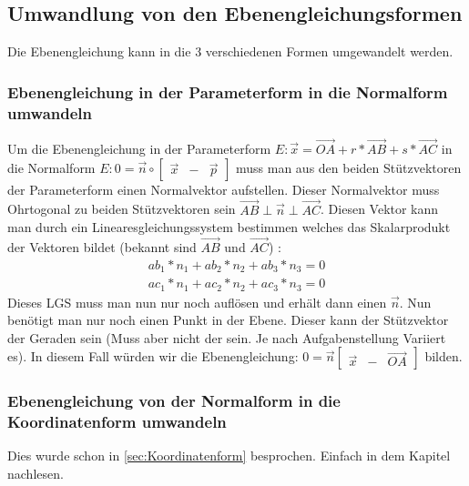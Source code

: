 \documentclass{article}
\begin{document}
\subsection{Umwandlung von den Ebenengleichungsformen} \label{UmformenDerEbenengleichung}
Die Ebenengleichung kann in die 3 verschiedenen Formen umgewandelt werden.
\subsubsection{Ebenengleichung in der Parameterform in die Normalform umwandeln} \label{ParameterformInNormalform}
Um die Ebenengleichung in der Parameterform $E : \vec{x} = \vec{OA} + r * \vec{AB} + s * \vec{AC}$ in die Normalform $E: 0 = \vec{n} \circ  \begin{bmatrix} \vec{x} & - & \vec{p} \end{bmatrix}$ muss man aus den beiden Stützvektoren der Parameterform einen Normalvektor aufstellen. Dieser Normalvektor muss Ohrtogonal zu beiden Stützvektoren sein $\vec{AB} \perp \vec{n} \perp \vec{AC}$. Diesen Vektor kann man durch ein Linearesgleichungssystem bestimmen welches das Skalarprodukt der Vektoren bildet (bekannt sind $\vec{AB}$ und $\vec{AC}$) : 
\begin{equation}
\begin{matrix}
ab_1 * n_1 + ab_2 * n_2 + ab_3 * n_3 = 0 \\
ac_1 * n_1 + ac_2 * n_2 + ac_3 * n_3 = 0
\end{matrix}
\end{equation}  
Dieses LGS muss man nun nur noch auflösen und erhält dann einen $\vec{n}$. Nun benötigt man nur noch einen Punkt in der Ebene. Dieser kann der Stützvektor der Geraden sein (Muss aber nicht der sein. Je nach Aufgabenstellung Variiert es). In diesem Fall würden wir die Ebenengleichung: $0 = \vec{n} \begin{bmatrix}\vec{x} & - & \vec{OA}\end{bmatrix}$ bilden.

\subsubsection{Ebenengleichung von der Normalform in die Koordinatenform umwandeln} \label{NormalenformInKoordinatenform}
Dies wurde schon in \ref{sec:Koordinatenform} besprochen. Einfach in dem Kapitel nachlesen.
\end{document}
